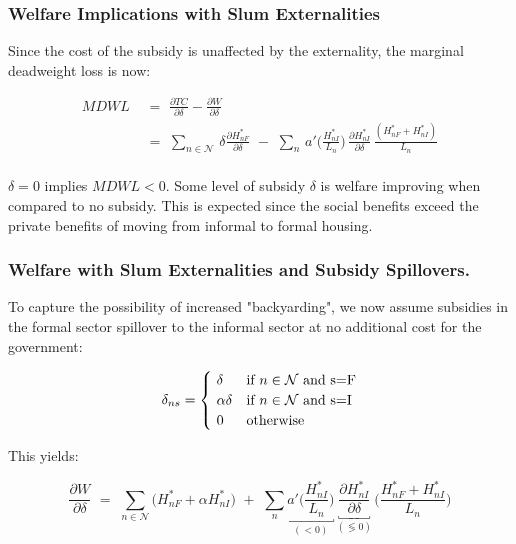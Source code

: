 \documentclass[aspectratio=149]{beamer}
\begin{document}

\begin{frame}
\frametitle{Welfare Implications with Slum Externalities}

Since the cost of the subsidy is unaffected by the externality, the marginal deadweight loss is now:

\begin{equation*}
\begin{aligned}
MDWL \,\,&=\,\, \frac{\partial TC}{\partial \delta} - \frac{\partial W}{\partial \delta} \\[.6em]
     \,\,&=\,\, \sum_{n\in\mathcal{N}} \,\delta\frac{\partial H^*_{nF}}{\partial \delta} \,\,-\,\, \sum_{n} \, a'\Big(\frac{H^*_{nI}}{L_n}\Big)\,\frac{\partial H^*_{nI}}{\partial \delta}\,\frac{(H^*_{nF}+H^*_{nI})}{L_n} \\
\end{aligned}
\end{equation*}

 $\delta=0$ implies $MDWL<0$. Some level of subsidy $\delta$ is welfare improving when compared to no subsidy. This is expected since the social benefits exceed the private benefits of moving from informal to formal housing. 

\end{frame}



\begin{frame}
\frametitle{Welfare with Slum Externalities and Subsidy Spillovers.}

To capture the possibility of increased "backyarding", we now assume subsidies in the formal sector spillover to the informal sector at no additional cost for the government:

\begin{equation*}
 \delta_{ns} = \begin{cases} 
      \,\,\delta & \text{if}\,\, n\in\mathcal{N} \,\,\text{and}\,\, $s=F$ \\
      \,\,\alpha\delta & \text{if}\,\, n\in\mathcal{N} \,\,\text{and}\,\, $s=I$ \\
      \,\,0 & \text{otherwise} 
   \end{cases}
\end{equation*}

This yields:

\begin{equation*}
\frac{\partial W}{\partial\delta} \,\,=\,\, \sum_{n\in\mathcal{N}} \big( H^*_{nF} + \alpha H^*_{nI} \big)  \,\,+\,\, \sum_{n} \underbracket{a'\Big(\frac{H^*_{nI}}{L_n}\Big)}_{(<0)}\,\underbracket{\frac{\partial H^*_{nI}}{\partial \delta}}_{(\lessgtr0)}\,\Big(\frac{H^*_{nF}+H^*_{nI}}{L_n} \Big)
\end{equation*} 

\end{frame}
\end{document}
